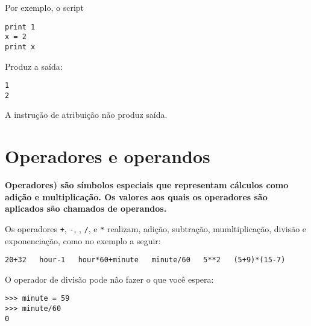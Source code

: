 {{{{{{{{{Por exemplo, o script

\beforeverb
\begin{verbatim}
print 1
x = 2
print x
\end{verbatim}
\afterverb
%

Produz a saída:

\beforeverb
\begin{verbatim}
1
2
\end{verbatim}
\afterverb
%

A instrução de atribuição não produz saída.

\section{Operadores e operandos}


{\bf Operadores) são símbolos especiais que representam cálculos como 
adição e multiplicação. Os valores aos quais os operadores são aplicados 
são chamados de {\bf operandos}.

Os operadores {\tt +}, {\tt -}, {\tt *}, {\tt /}, e {\tt **} 
realizam, adição, subtração, mumltiplicação, divisão 
e exponenciação, como no exemplo a seguir:

\beforeverb
\begin{verbatim}
20+32   hour-1   hour*60+minute   minute/60   5**2   (5+9)*(15-7)
\end{verbatim}
\afterverb
%

O operador de divisão pode não fazer o que você espera: 

\beforeverb
\begin{verbatim}
>>> minute = 59
>>> minute/60
0
\end{verbatim}
\afterverb
%

}}}}}}}}}}
